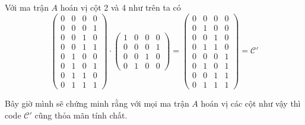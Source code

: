 Với ma trận $A$ hoán vị cột 2 và 4 như trên ta có
\begin{equation*}
    \begin{pmatrix}
        0 & 0 & 0 & 0 \\
        0 & 0 & 0 & 1 \\
        0 & 0 & 1 & 0 \\
        0 & 0 & 1 & 1 \\
        0 & 1 & 0 & 0 \\
        0 & 1 & 0 & 1 \\
        0 & 1 & 1 & 0 \\
        0 & 1 & 1 & 1 
    \end{pmatrix} \cdot 
    \begin{pmatrix}
        1 & 0 & 0 & 0 \\
        0 & 0 & 0 & 1 \\ 
        0 & 0 & 1 & 0 \\ 
        0 & 1 & 0 & 0 
    \end{pmatrix} = 
    \begin{pmatrix} 
        0 & 0 & 0 & 0 \\ 
        0 & 1 & 0 & 0 \\ 
        0 & 0 & 1 & 0 \\ 
        0 & 1 & 1 & 0 \\ 
        0 & 0 & 0 & 1 \\ 
        0 & 1 & 0 & 1 \\ 
        0 & 0 & 1 & 1 \\ 
        0 & 1 & 1 & 1
    \end{pmatrix} = \mathcal{C}'
\end{equation*}

Bây giờ mình sẽ chứng minh rằng với mọi ma trận $A$ hoán vị các cột như vậy thì code $\mathcal{C}'$ cũng thỏa mãn tính chất.

